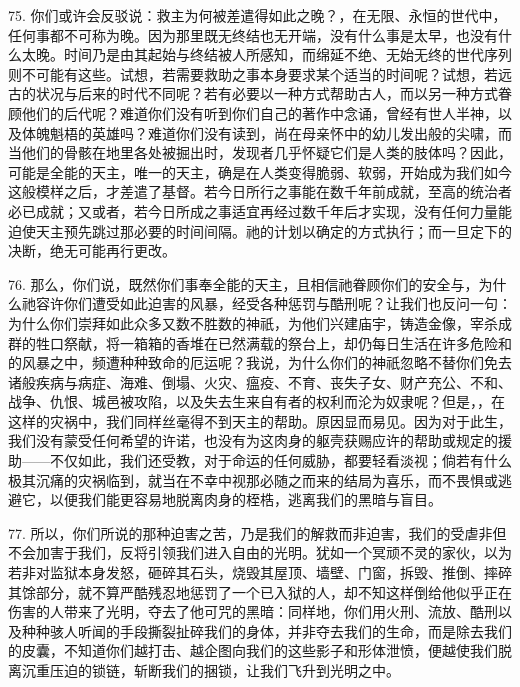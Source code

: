 75. 你们或许会反驳说：救主为何被差遣得如此之晚？，在无限、永恒的世代中，任何事都不可称为晚。因为那里既无终结也无开端，没有什么事是太早，也没有什么太晚。时间乃是由其起始与终结被人所感知，而绵延不绝、无始无终的世代序列则不可能有这些。试想，若需要救助之事本身要求某个适当的时间呢？试想，若远古的状况与后来的时代不同呢？若有必要以一种方式帮助古人，而以另一种方式眷顾他们的后代呢？难道你们没有听到你们自己的著作中念诵，曾经有世人半神，以及体魄魁梧的英雄吗？难道你们没有读到，尚在母亲怀中的幼儿发出般的尖啸，而当他们的骨骸在地里各处被掘出时，发现者几乎怀疑它们是人类的肢体吗？因此，可能是全能的天主，唯一的天主，确是在人类变得脆弱、软弱，开始成为我们如今这般模样之后，才差遣了基督。若今日所行之事能在数千年前成就，至高的统治者必已成就；又或者，若今日所成之事适宜再经过数千年后才实现，没有任何力量能迫使天主预先跳过那必要的时间间隔。祂的计划以确定的方式执行；而一旦定下的决断，绝无可能再行更改。\par

76. 那么，你们说，既然你们事奉全能的天主，且相信祂眷顾你们的安全与，为什么祂容许你们遭受如此迫害的风暴，经受各种惩罚与酷刑呢？让我们也反问一句：为什么你们崇拜如此众多又数不胜数的神祇，为他们兴建庙宇，铸造金像，宰杀成群的牲口祭献，将一箱箱的香堆在已然满载的祭台上，却仍每日生活在许多危险和的风暴之中，频遭种种致命的厄运呢？我说，为什么你们的神祇忽略不替你们免去诸般疾病与病症、海难、倒塌、火灾、瘟疫、不育、丧失子女、财产充公、不和、战争、仇恨、城邑被攻陷，以及失去生来自有者的权利而沦为奴隶呢？但是，，在这样的灾祸中，我们同样丝毫得不到天主的帮助。原因显而易见。因为对于此生，我们没有蒙受任何希望的许诺，也没有为这肉身的躯壳获赐应许的帮助或规定的援助——不仅如此，我们还受教，对于命运的任何威胁，都要轻看淡视；倘若有什么极其沉痛的灾祸临到，就当在不幸中视那必随之而来的结局为喜乐，而不畏惧或逃避它，以便我们能更容易地脱离肉身的桎梏，逃离我们的黑暗与盲目。\par

77. 所以，你们所说的那种迫害之苦，乃是我们的解救而非迫害，我们的受虐非但不会加害于我们，反将引领我们进入自由的光明。犹如一个冥顽不灵的家伙，以为若非对监狱本身发怒，砸碎其石头，烧毁其屋顶、墙壁、门窗，拆毁、推倒、摔碎其馀部分，就不算严酷残忍地惩罚了一个已入狱的人，却不知这样倒给他似乎正在伤害的人带来了光明，夺去了他可咒的黑暗：同样地，你们用火刑、流放、酷刑以及种种骇人听闻的手段撕裂扯碎我们的身体，并非夺去我们的生命，而是除去我们的皮囊，不知道你们越打击、越企图向我们的这些影子和形体泄愤，便越使我们脱离沉重压迫的锁链，斩断我们的捆锁，让我们飞升到光明之中。\par

